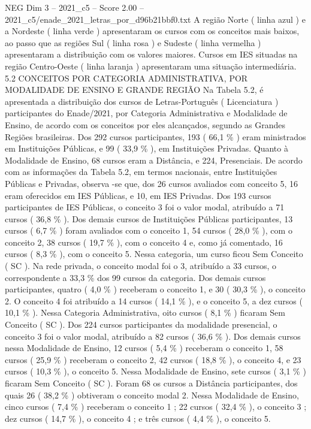 \begin{textsample}{NEG Dim 3 – 2021\_c5 – Score 2.00 – 2021\_c5/enade\_2021\_letras\_por\_d96b21bbf0.txt}
A região Norte ( linha azul ) e a Nordeste ( linha verde ) apresentaram os cursos com os conceitos mais baixos, ao passo que as regiões Sul ( linha rosa ) e Sudeste ( linha vermelha ) apresentaram a distribuição com os valores maiores.
Cursos em IES situadas na região Centro-Oeste ( linha laranja ) apresentaram uma situação intermediária. 5.2 CONCEITOS POR CATEGORIA ADMINISTRATIVA, POR MODALIDADE DE ENSINO E GRANDE REGIÃO Na Tabela 5.2, é apresentada a distribuição dos cursos de Letras-Português ( Licenciatura ) participantes do Enade/2021, por Categoria Administrativa e Modalidade de Ensino, de acordo com os conceitos por eles alcançados, segundo as Grandes Regiões brasileiras.
Dos 292 cursos participantes, 193 ( 66,1 \% ) eram ministrados em Instituições Públicas, e 99 ( 33,9 \% ), em Instituições Privadas.
Quanto à Modalidade de Ensino, 68 cursos eram a Distância, e 224, Presenciais.
De acordo com as informações da Tabela 5.2, em termos nacionais, entre Instituições Públicas e Privadas, observa -se que, dos 26 cursos avaliados com conceito 5, 16 eram oferecidos em IES Públicas, e 10, em IES Privadas.
Dos 193 cursos participantes de IES Públicas, o conceito 3 foi o valor modal, atribuído a 71 cursos ( 36,8 \% ).
Dos demais cursos de Instituições Públicas participantes, 13 cursos ( 6,7 \% ) foram avaliados com o conceito 1, 54 cursos ( 28,0 \% ), com o conceito 2, 38 cursos ( 19,7 \% ), com o conceito 4 e, como já comentado, 16 cursos ( 8,3 \% ), com o conceito 5.
Nessa categoria, um curso ficou Sem Conceito ( SC ).
Na rede privada, o conceito modal foi o 3, atribuído a 33 cursos, o correspondente a 33,3 \% dos 99 cursos da categoria.
Dos demais cursos participantes, quatro ( 4,0 \% ) receberam o conceito 1, e 30 ( 30,3 \% ), o conceito 2.
O conceito 4 foi atribuído a 14 cursos ( 14,1 \% ), e o conceito 5, a dez cursos ( 10,1 \% ).
Nessa Categoria Administrativa, oito cursos ( 8,1 \% ) ficaram Sem Conceito ( SC ).
Dos 224 cursos participantes da modalidade presencial, o conceito 3 foi o valor modal, atribuído a 82 cursos ( 36,6 \% ).
Dos demais cursos nessa Modalidade de Ensino, 12 cursos ( 5,4 \% ) receberam o conceito 1, 58 cursos ( 25,9 \% ) receberam o conceito 2, 42 cursos ( 18,8 \% ), o conceito 4, e 23 cursos ( 10,3 \% ), o conceito 5.
Nessa Modalidade de Ensino, sete cursos ( 3,1 \% ) ficaram Sem Conceito ( SC ).
Foram 68 os cursos a Distância participantes, dos quais 26 ( 38,2 \% ) obtiveram o conceito modal 2.
Nessa Modalidade de Ensino, cinco cursos ( 7,4 \% ) receberam o conceito 1 ; 22 cursos ( 32,4 \% ), o conceito 3 ; dez cursos ( 14,7 \% ), o conceito 4 ; e três cursos ( 4,4 \% ), o conceito 5.

\end{textsample}
